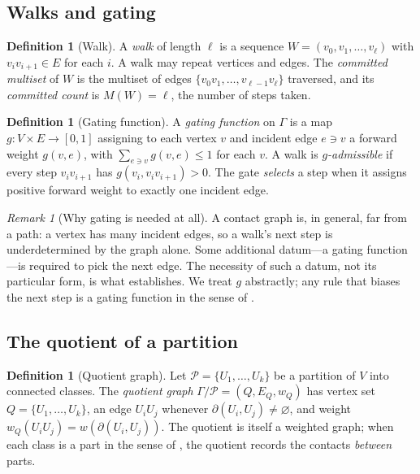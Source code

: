 \documentclass[11pt,a4paper]{article}
\theoremstyle{thmstyle}
\theoremstyle{definition}
\newtheorem{definition}[theorem]{Definition}
\theoremstyle{remark}
\newtheorem{remark}[theorem]{Remark}
\newcommand{\Gph}{\Gamma}                 %
\newcommand{\V}{V}                        %
\newcommand{\E}{E}                        %
\newcommand{\wt}{w}                       %
\newcommand{\cut}{\partial}               %
\newcommand{\Walk}{W}                     %
\newcommand{\gate}{g}                     %
\newcommand{\Quot}{Q}                     %
\newcommand{\rec}{M}                      %
\begin{document}
\subsection{Walks and gating}

\begin{definition}[Walk]
\label{def:walk}
A \emph{walk} of length $\ell$ is a sequence
$\Walk=(v_0,v_1,\dots,v_\ell)$ with $v_{i}v_{i+1}\in\E$ for each $i$. A walk may
repeat vertices and edges. The \emph{committed multiset} of $\Walk$ is the
multiset of edges $\{v_0v_1,\dots,v_{\ell-1}v_\ell\}$ traversed, and its
\emph{committed count} is $\rec(\Walk)=\ell$, the number of steps taken.
\end{definition}

\begin{definition}[Gating function]
\label{def:gate}
A \emph{gating function} on $\Gph$ is a map
$\gate\colon\V\times\E\to[0,1]$ assigning to each vertex $v$ and incident edge
$e\ni v$ a forward weight $\gate(v,e)$, with $\sum_{e\ni v}\gate(v,e)\le 1$ for
each $v$. A walk is \emph{$\gate$-admissible} if every step $v_iv_{i+1}$ has
$\gate(v_i,v_iv_{i+1})>0$. The gate \emph{selects} a step when it assigns
positive forward weight to exactly one incident edge.
\end{definition}

\begin{remark}[Why gating is needed at all]
\label{rem:gate-need}
A contact graph is, in general, far from a path: a vertex has many incident
edges, so a walk's next step is underdetermined by the graph alone. Some
additional datum---a gating function---is required to pick the next edge. The
necessity of such a datum, not its particular form, is what
 establishes. We treat $\gate$ abstractly; any rule that biases
the next step is a gating function in the sense of .
\end{remark}

\subsection{The quotient of a partition}

\begin{definition}[Quotient graph]
\label{def:quotient}
Let $\mathcal{P}=\{U_1,\dots,U_k\}$ be a partition of $\V$ into connected
classes. The \emph{quotient graph} $\Gph/\mathcal{P}=(\Quot,\E_{\Quot},\wt_{\Quot})$
has vertex set $\Quot=\{U_1,\dots,U_k\}$, an edge $U_iU_j$ whenever
$\cut(U_i,U_j)\neq\varnothing$, and weight
$\wt_{\Quot}(U_iU_j)=\wt(\cut(U_i,U_j))$. The quotient is itself a weighted
graph; when each class is a part in the sense of , the
quotient records the contacts \emph{between} parts.
\end{definition}
\end{document}
